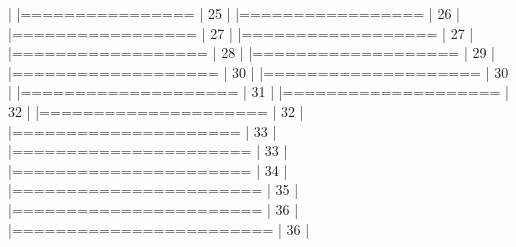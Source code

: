 \documentclass[10pt]{article}
\newenvironment{CodeChunk}{}{}
\begin{document}
\begin{CodeChunk}
\begin{CodeChunk}
\begin{CodeOutput}
  |                                                                       
  |================                                                 |  25%
  |                                                                       
  |=================                                                |  26%
  |                                                                       
  |=================                                                |  27%
  |                                                                       
  |==================                                               |  27%
  |                                                                       
  |==================                                               |  28%
  |                                                                       
  |===================                                              |  29%
  |                                                                       
  |===================                                              |  30%
  |                                                                       
  |====================                                             |  30%
  |                                                                       
  |====================                                             |  31%
  |                                                                       
  |====================                                             |  32%
  |                                                                       
  |=====================                                            |  32%
  |                                                                       
  |=====================                                            |  33%
  |                                                                       
  |======================                                           |  33%
  |                                                                       
  |======================                                           |  34%
  |                                                                       
  |=======================                                          |  35%
  |                                                                       
  |=======================                                          |  36%
  |                                                                       
  |========================                                         |  36%
  |                                                                       

\end{CodeOutput}
\end{CodeChunk}
\end{CodeChunk}
\end{document}
